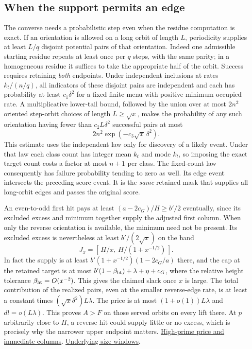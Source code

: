 \subsection{When the support permits an edge}

The converse needs a probabilistic step even when the residue computation is exact. If an orientation is allowed on a long orbit of length \(L\), periodicity supplies at least \(L/q\) disjoint potential pairs of that orientation. Indeed one admissible starting residue repeats at least once per \(q\) steps, with the same parity; in a homogeneous residue it suffices to take the appropriate half of the orbit. Success requires retaining \emph{both} endpoints. Under independent inclusions at rates \(k_t/(n/q)\), all indicators of these disjoint pairs are independent and each has probability at least \(c_1\delta^2\) for a fixed finite menu with positive minimum occupied rate. A multiplicative lower-tail bound, followed by the union over at most \(2n^2\) oriented step-orbit choices of length \(L\ge\sqrt{x}\), makes the probability of any such orientation having fewer than \(c_2 L\delta^2\) successful pairs at most
\[
 2n^2\exp(-c_3\sqrt{x}\,\delta^2).
\]
This estimate uses the independent law only for discovery of a likely event. Under that law each class count has integer mean \(k_t\) and mode \(k_t\), so imposing the exact target count costs a factor at most \(n+1\) per class. The fixed-count law consequently has failure probability tending to zero as well. Its edge event intersects the preceding score event. It is the \emph{same} retained mask that supplies all long-orbit edges and passes the original score.

An even-to-odd first hit pays at least \((a-2c_G)/H\ge b'/2\) eventually, since its excluded excess and minimum together supply the adjusted first column. When only the reverse orientation is available, the minimum need not be present. Its excluded excess is nevertheless at least \(b'/(2\sqrt{x})\) on the band
\[
 J_x=\left[\,H/x,\ H/(1+x^{-1/2})\,\right].
\]
In fact the supply is at least \(b'(1+x^{-1/2})(1-2c_G/a)\) there, and the cap at the retained target is at most \(b'(1+\beta_{\rm ht})+\lambda+\eta+c_G\), where the relative height tolerance \(\beta_{\rm ht}=O(x^{-2})\). This gives the claimed slack once \(x\) is large. The total contribution of the realized pairs, even at the smaller reverse-edge rate, is at least a constant times \((\sqrt{x}\delta^2)L\lambda\). The price is at most \((1+o(1))L\lambda\) and \(dl=o(L\lambda)\). This proves \(A>F\) on those served orbits on every lift there. At \(p\) arbitrarily close to \(H\), a reverse hit could supply little or no excess, which is precisely why the narrower upper endpoint matters.
\href{https://github.com/nousentllc/riemann-hypothesis/blob/40e56bab026552e089d7afcfeff08d2defb9c005/src/Formalism/SharpRestriction/GrowthBounds/LogarithmicSums/PartnerCountOfCentral.lean#L769-L828}{High-prime price and immediate columns}.
\href{https://github.com/nousentllc/riemann-hypothesis/blob/40e56bab026552e089d7afcfeff08d2defb9c005/src/Formalism/SizeWindowBrackets/WindowSettingSatisfiable.lean#L65-L117}{Underlying size windows}.

